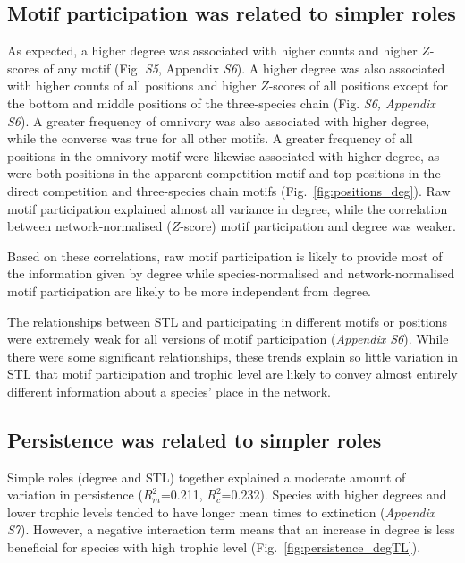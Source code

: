 \documentclass[12pt]{article}
\begin{document}
\begin{spacing}{2.0}
    \subsection*{Motif participation was related to simpler roles}    
    
        As expected, a higher degree was associated with higher counts and higher $Z$-scores of any motif (Fig. \emph{S5}, Appendix \emph{S6}).
        A higher degree was also associated with higher counts of all positions and higher $Z$-scores of all positions except for the bottom and middle positions of the three-species chain (Fig. \emph{S6, Appendix S6}).
        A greater frequency of omnivory was also associated with higher degree, while the converse was true for all other motifs.
        A greater frequency of all positions in the omnivory motif were likewise associated with higher degree, as were both positions in the apparent competition motif and top positions in the direct competition and three-species chain motifs (Fig.~\ref{fig:positions_deg}).
        Raw motif participation explained almost all variance in degree, while the correlation between network-normalised ($Z$-score) motif participation and degree was weaker.

        Based on these correlations, raw motif participation is likely to provide most of the information given by degree while species-normalised and network-normalised motif participation are likely to be more independent from degree.
        
    
        The relationships between STL and participating in different motifs or positions were extremely weak for all versions of motif participation (\emph{Appendix S6}).
        While there were some significant relationships, these trends explain so little variation in STL that motif participation and trophic level are likely to convey almost entirely different information about a species' place in the network.
    

    \subsection*{Persistence was related to simpler roles}
    
        Simple roles (degree and STL) together explained a moderate amount of variation in persistence ($R^2_m$=0.211, $R^2_c$=0.232).
        Species with higher degrees and lower trophic levels tended to have longer mean times to extinction (\emph{Appendix S7}).
        However, a negative interaction term means that an increase in degree is less beneficial for species with high trophic level (Fig.~\ref{fig:persistence_degTL}).
    

\end{spacing}
\end{document}
